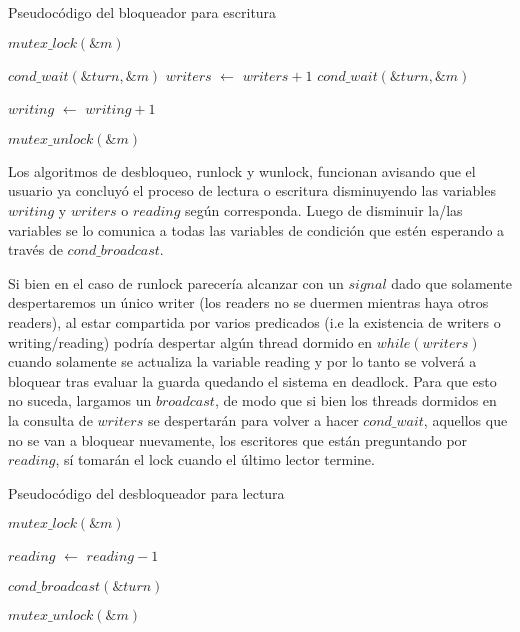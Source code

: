 \begin{algorithm}[H]
  \begin{algorithmic}[1]
  \caption{Pseudocódigo del bloqueador para escritura}
  \label{algo:3-1}
	\State $mutex\_lock(\&m)$

		\State $ cond\_wait(\&turn, \&m) $
	\EndWhile
	\State $writers$ $\leftarrow$ $writers + 1$
		\State $ cond\_wait(\&turn, \&m) $
	\EndWhile
	
	\State $writing$ $\leftarrow$ $writing + 1$

	\State $mutex\_unlock(\&m)$

	\EndProcedure
	\end{algorithmic}
\end{algorithm}

Los algoritmos de desbloqueo, runlock y wunlock, funcionan avisando que el usuario ya concluyó el proceso de lectura o escritura disminuyendo las variables $writing$ y $writers$ o $reading$ según corresponda. Luego de disminuir la/las variables se lo comunica a todas las variables de condición que estén esperando a través de $cond\_broadcast$.

Si bien en el caso de runlock parecería alcanzar con un $signal$ dado que solamente despertaremos un único writer (los readers no se duermen mientras haya otros readers), al estar compartida por varios predicados (i.e la existencia de writers o writing/reading) podría despertar algún thread dormido en $while(writers)$ cuando solamente se actualiza la variable reading y por lo tanto se volverá a bloquear tras evaluar la guarda quedando el sistema en deadlock. Para que esto no suceda, largamos un $broadcast$, de modo que si bien los threads dormidos en la consulta de $writers$ se despertarán para volver a hacer $cond\_wait$, aquellos que no se van a bloquear nuevamente, los  escritores que están preguntando por $reading$, sí tomarán el lock cuando el último lector termine.

\begin{algorithm}[H]
  \begin{algorithmic}[1]
  \caption{Pseudocódigo del desbloqueador para lectura}
  \label{algo:3-1}
	\State $mutex\_lock(\&m)$

	\State $reading$ $\leftarrow$ $reading - 1$
	
	\State $cond\_broadcast(\&turn)$

	\State $mutex\_unlock(\&m)$

	\EndProcedure
	\end{algorithmic}
\end{algorithm}

